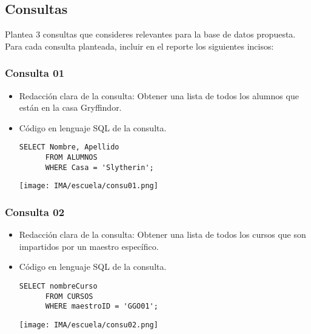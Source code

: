 \subsection{Consultas}

Plantea 3 consultas que consideres relevantes para la base de datos propuesta. Para cada consulta planteada, incluir en el reporte los siguientes incisos:

\subsubsection*{Consulta 01}
\begin{itemize}
    \item Redacción clara de la consulta: Obtener una lista de todos los alumnos que están en la casa Gryffindor.
    \item Código en lenguaje SQL de la consulta.
    
    \begin{lstlisting}[caption={Tablas para la BdDatos}, label={lst:sql_estadios}]
      SELECT Nombre, Apellido
      FROM ALUMNOS
      WHERE Casa = 'Slytherin';
    \end{lstlisting}    

    \begin{center}
      \texttt{[image: IMA/escuela/consu01.png]}
    \end{center}
    
\end{itemize}


\subsubsection*{Consulta 02}
\begin{itemize}
    \item Redacción clara de la consulta: Obtener una lista de todos los cursos que son impartidos por un maestro específico.
    \item Código en lenguaje SQL de la consulta.
    
    \begin{lstlisting}[caption={Tablas para la BdDatos}, label={lst:sql_estadios}]
      SELECT nombreCurso
      FROM CURSOS
      WHERE maestroID = 'GGO01';
    \end{lstlisting}    

    \begin{center}
      \texttt{[image: IMA/escuela/consu02.png]}
    \end{center}
    
\end{itemize}


